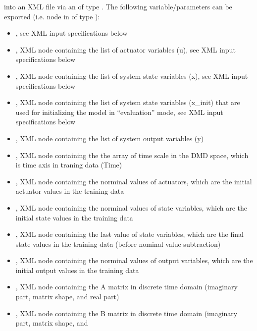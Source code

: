   into an XML file         via an  of type . The following
  variable/parameters can be exported (i.e.          node         in
   of type ):         \begin{itemize}           \item
  , see XML input specifications below           \item {}, XML
  node containing the list of actuator variables (u),                 see XML input specifications
  below           \item {}, XML node containing the list of system state
  variables (x),                 see XML input specifications below           \item
  , XML node containing the list of system state variables
  (x\_init) that are used for initializing the model in ``evaluation'' mode,                 see XML
  input specifications below           \item {}, XML node containing the list of
  system output variables (y)           \item {}, XML node containing the the
  array of time scale in the DMD space,                 which is time axis in traning data (Time)
  \item {}, XML node containing the norminal values of actuators,                 which
  are the initial actuator values in the training data           \item {}, XML node
  containing the norminal values of state variables,                 which are the initial state
  values in the training data           \item {}, XML node containing the last value of
  state variables,                 which are the final state values in the training data (before
  nominal value subtraction)           \item {}, XML node containing the norminal
  values of output variables,                 which are the initial output values in the training
  data           \item {},  XML node containing the A matrix in discrete time domain
  (imaginary part, matrix shape, and real part)           \item {}, XML node
  containing the B matrix in discrete time domain                 (imaginary part, matrix shape, and

\end{itemize}

